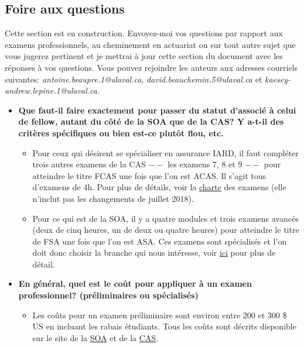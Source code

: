 \subsection*{Foire aux questions}
\label{subsec:faq}
Cette section est en construction. Envoyez-moi vos questions par rapport aux examens professionnels, au cheminement en actuariat ou sur tout autre sujet que vous jugerez pertinent et je mettrai à jour cette section du document avec les réponses à vos questions. Vous pouvez rejoindre les auteurs aux adresses courriels suivantes: \emph{antoine.beaupre.1@ulaval.ca}, \emph{david.beauchemin.5@ulaval.ca} et \emph{kaesey-andrew.lepine.1@ulaval.ca}.\newline

\begin{itemize}
\item \textbf{Que faut-il faire exactement pour passer du statut d’associé à celui de fellow, autant du côté de la SOA que de la CAS? Y a-t-il des critères spécifiques ou bien est-ce plutôt flou, etc.}
	\begin{itemize}
	\item Pour ceux qui désirent se spécialiser en assurance IARD, il faut compléter trois autres examens de la CAS $--$ les examens 7, 8 et 9 $--$ pour atteindre le titre FCAS une fois que l'on est ACAS. Il s'agit tous d'examens de 4h. Pour plus de détails, voir la \href{http://www.casact.org/admissions/process/}{charte} des examens (elle n'inclut pas les changements de juillet 2018). 
	\item Pour ce qui est de la SOA, il y a quatre modules et trois examens avancés (deux de cinq heures, un de deux ou quatre heures) pour atteindre le titre de FSA une fois que l'on est ASA. Ces examens sont spécialisés et l'on doit donc choisir la branche qui nous intéresse, voir \href{https://www.soa.org/Education/Exam-Req/edu-fsa-req.aspx}{ici} pour plus de détail.
	\end{itemize}
\item \textbf{En général, quel est le coût pour appliquer à un examen professionnel? (préliminaires ou spécialisés)}
	\begin{itemize}
	\item Les coûts pour un examen préliminaire sont environ entre 200 et 300 \$ US en incluant les rabais étudiants. Tous les coûts sont décrits disponible sur le site de la \href{https://www.soa.org/Education/Exam-Req/Syllabus-Study-Materials/Exam-and-Module-Fees.aspx}{SOA} et de la \href{http://www.casact.org/admissions/exams/}{CAS}.

\end{itemize}
\end{itemize}
